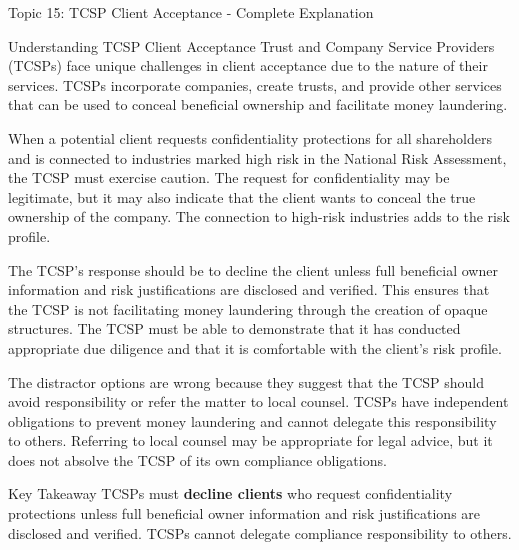 \documentclass[8pt]{beamer}  %
\begin{document}
	\begin{frame}{Topic 15: TCSP Client Acceptance - Complete Explanation}
		\begin{block}{\large Understanding TCSP Client Acceptance}
			Trust and Company Service Providers (TCSPs) face unique challenges in client acceptance due to the nature of their services. TCSPs incorporate companies, create trusts, and provide other services that can be used to conceal beneficial ownership and facilitate money laundering.
			
			When a potential client requests confidentiality protections for all shareholders and is connected to industries marked high risk in the National Risk Assessment, the TCSP must exercise caution. The request for confidentiality may be legitimate, but it may also indicate that the client wants to conceal the true ownership of the company. The connection to high-risk industries adds to the risk profile.
			
			The TCSP's response should be to decline the client unless full beneficial owner information and risk justifications are disclosed and verified. This ensures that the TCSP is not facilitating money laundering through the creation of opaque structures. The TCSP must be able to demonstrate that it has conducted appropriate due diligence and that it is comfortable with the client's risk profile.
			
			The distractor options are wrong because they suggest that the TCSP should avoid responsibility or refer the matter to local counsel. TCSPs have independent obligations to prevent money laundering and cannot delegate this responsibility to others. Referring to local counsel may be appropriate for legal advice, but it does not absolve the TCSP of its own compliance obligations.
		\end{block}
		
		\begin{alertblock}{Key Takeaway}
			TCSPs must \textbf{decline clients} who request confidentiality protections unless full beneficial owner information and risk justifications are disclosed and verified. TCSPs cannot delegate compliance responsibility to others.
		\end{alertblock}
	\end{frame}
	
\end{document}

